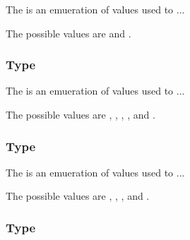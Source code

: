 The  is an emueration of values used to ...

The possible values are  and .

\subsubsection{Type \fixttspace{}}



The  is an emueration of values used to ...

The possible values are , , ,
,  and .

\subsubsection{Type \fixttspace{}}



The  is an emueration of values used to ...

The possible values are , , ,
 and .

\subsubsection{Type \fixttspace{}}

